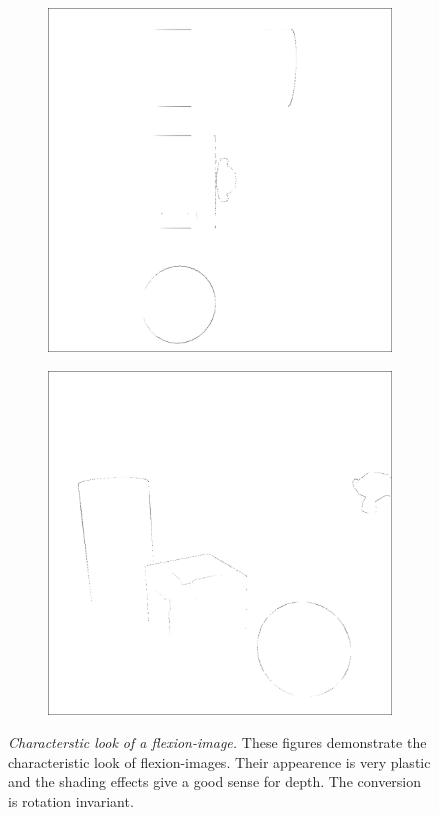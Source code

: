\begin{figure}[H]
\begin{subfigure}[t]{0.32\textwidth}
        \includegraphics[width=\linewidth]{chapter04/img/flexion-0030.png}
    \end{subfigure}
    \begin{subfigure}[t]{0.32\textwidth}
        \includegraphics[width=\linewidth]{chapter04/img/flexion-0210.png}
    \end{subfigure}
    \caption[Characterstic look of a \gls{flexion-image}]{\emph{Characterstic look of a \gls{flexion-image}.} These figures demonstrate the characteristic look of \Glspl{flexion-image}. Their appearence is very plastic and the shading effects give a good sense for depth. The conversion is rotation invariant.}\label{fig:flexion_images}
\end{figure}
